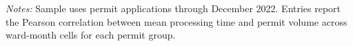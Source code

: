\begin{table}[htbp]
    \centering
    \caption{Processing Time and Permit Volume Correlation}
    \label{tab:permit_volume_correlation}
    

    \footnotesize
    \textit{Notes:} Sample uses permit applications through December 2022.
    Entries report the Pearson correlation between mean processing time and permit volume across ward-month cells for each permit group.
\end{table}
